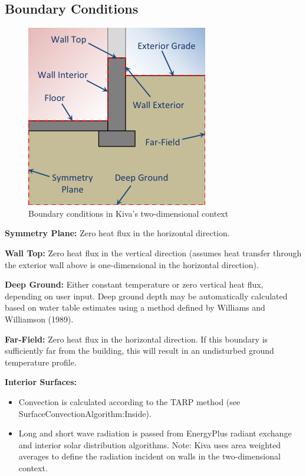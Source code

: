 \subsection{Boundary Conditions}\label{boundary-conditions}

\begin{figure}
\centering
\includegraphics{media/kiva-2d-boundaries.png}
\caption{Boundary conditions in Kiva's two-dimensional
context\label{fig:bnd}}
\end{figure}

\textbf{Symmetry Plane:} Zero heat flux in the horizontal direction.

\textbf{Wall Top:} Zero heat flux in the vertical direction (assumes
heat transfer through the exterior wall above is one-dimensional in the
horizontal direction).

\textbf{Deep Ground:} Either constant temperature or zero vertical heat
flux, depending on user input. Deep ground depth may be automatically
calculated based on water table estimates using a method defined by
Williams and Williamson (1989).

\textbf{Far-Field:} Zero heat flux in the horizontal direction. If this
boundary is sufficiently far from the building, this will result in an
undisturbed ground temperature profile.

\textbf{Interior Surfaces:}

\begin{itemize}
\tightlist
\item
  Convection is calculated according to the TARP method (see
  SurfaceConvectionAlgorithm:Inside).
\item
  Long and short wave radiation is passed from EnergyPlus radiant
  exchange and interior solar distribution algorithms. Note: Kiva uses
  area weighted averages to define the radiation incident on walls in
  the two-dimensional context.
\end{itemize}

